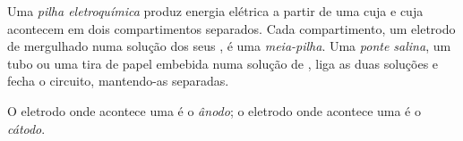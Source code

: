 \begin{definition}\label{def:g12:cells-and-electrolysis:cell}
Uma \emph{pilha eletroquímica} produz energia
elétrica a partir de uma  cuja  e cuja
 acontecem em dois compartimentos separados. Cada compartimento,
um eletrodo de  mergulhado numa solução dos seus , é uma
\emph{meia-pilha}. Uma \emph{ponte
salina}, um tubo ou uma tira de papel embebida numa
solução de , liga as duas soluções e fecha o circuito, mantendo-as
separadas.
\end{definition}

\begin{definition}\label{def:g12:cells-and-electrolysis:anode}
O eletrodo onde acontece uma  é o \emph{ânodo}; o
eletrodo onde acontece uma  é o \emph{cátodo}.
\end{definition}

